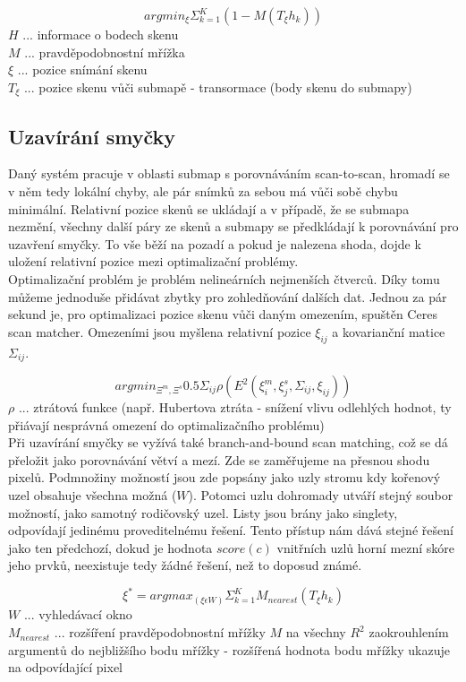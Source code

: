 \documentclass[11pt]{article}
\begin{document}
$$argmin_\xi\Sigma^K_{k=1}(1-M(T_{\xi}h_k))$$
$H$ ... informace o bodech skenu\\
$M$ ... pravděpodobnostní mřížka\\
$\xi$ ... pozice snímání skenu\\
$T_{\xi}$ ... pozice skenu vůči submapě - transormace (body skenu do submapy)\\

\subsection{Uzavírání smyčky}
Daný systém pracuje v oblasti submap s porovnáváním scan-to-scan, hromadí se v něm tedy lokální chyby, ale pár snímků za sebou má vůči sobě chybu minimální. Relativní pozice skenů se ukládají a v případě, že se submapa nezmění, všechny další páry ze skenů a submapy se předkládají k porovnávání pro uzavření smyčky. To vše běží na pozadí a pokud je nalezena shoda, dojde k uložení relativní pozice mezi optimalizační problémy.\\
\indent Optimalizační problém je problém nelineárních nejmenších čtverců. Díky tomu můžeme jednoduše přidávat zbytky pro zohledňování dalších dat. Jednou za pár sekund je, pro optimalizaci pozice skenu vůči daným omezením, spuštěn Ceres scan matcher. Omezeními jsou myšlena relativní pozice $\xi_{ij}$ a kovarianční matice $\Sigma_{ij}$.

$$argmin_{\Xi^m,\Xi^s}0.5\Sigma_{ij}\rho(E^2(\xi_i^m,\xi_j^s,\Sigma_{ij},\xi_{ij}))$$
$\rho$ ... ztrátová funkce (např. Hubertova ztráta - snížení vlivu odlehlých hodnot, ty přiávají nesprávná omezení do optimalizačního problému)\\

\indent Při uzavírání smyčky se vyžívá také branch-and-bound scan matching, což se dá přeložit jako porovnávání větví a mezí. Zde se zaměřujeme na přesnou shodu pixelů. Podmnožiny možností jsou zde popsány jako uzly stromu kdy kořenový uzel obsahuje všechna možná ($W$). Potomci uzlu dohromady utváří stejný soubor možností, jako samotný rodičovský uzel. Listy jsou brány jako singlety, odpovídají jedinému proveditelnému řešení. Tento přístup nám dává stejné řešení jako ten předchozí, dokud je hodnota $score(c)$ vnitřních uzlů horní mezní skóre jeho prvků, neexistuje tedy žádné řešení, než to doposud známé.

$$\xi^*=argmax_{(\xi\epsilon W)}\Sigma_{k=1}^KM_{nearest}(T_{\xi}h_k) $$
$W$ ... vyhledávací okno\\
$M_{nearest}$ ... rozšíření pravděpodobnostní mřížky $M$ na všechny $R^2$ zaokrouhlením argumentů do nejbližšího bodu mřížky - rozšířená hodnota bodu mřížky ukazuje na odpovídající pixel\\
\end{document}
